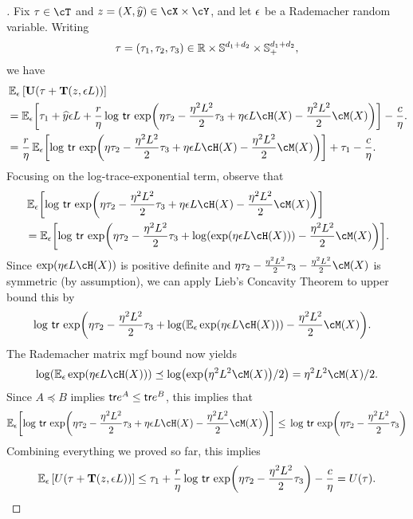 \begin{proof}[]
Fix $\tau\in\cT$ and $z=(X, \pred)\in\cX\times{}\cY$, and let $\epsilon$ be a Rademacher random variable. Writing
\[
\tau = (\tau_{1}, \tau_{2}, \tau_{3})\in{\mathbb R}\times \mathbb{S}^{d_1+d_2}\times \mathbb{S}^{d_1+d_2}_{+},
\]
we have
\begin{align*}
 &\En_{\eps}\left[\burk(\tau + \suff(z,\eps{}L))\right] \\
 &= \En_{\eps}\brk*{
   \tau_{1} + \pred\eps{}L + \frac{r}{\eta}\log\,\Tr\,\exp\prn*{\eta{}\tau_{2} - \frac{\eta^{2}L^{2}}{2}\tau_{3} + \eta\eps{}L\cH(X) - \frac{\eta^{2}L^{2}}{2}\cM(X)}
   } - \frac{c}{\eta}. \\
   &= \frac{r}{\eta}\En_{\eps}\brk*{
     \log\,\Tr\,\exp\prn*{\eta{}\tau_{2} - \frac{\eta^{2}L^{2}}{2}\tau_{3} + \eta\eps{}L\cH(X) - \frac{\eta^{2}L^{2}}{2}\cM(X)}
   } +      \tau_{1} - \frac{c}{\eta}.
\end{align*}
Focusing on the log-trace-exponential term, observe that
\begin{align*}
  &  \En_{\eps}\brk*{
  \log\,\Tr\,\exp\prn*{\eta{}\tau_{2} - \frac{\eta^{2}L^{2}}{2}\tau_{3} + \eta\eps{}L\cH(X) - \frac{\eta^{2}L^{2}}{2}\cM(X)}
} \\
&=  \En_{\eps}\brk*{
       \log\,\Tr\,\exp\prn*{\eta{}\tau_{2} - \frac{\eta^{2}L^{2}}{2}\tau_{3} + \log\prn*{\exp\prn*{\eta\eps{}L\cH(X)}} - \frac{\eta^{2}L^{2}}{2}\cM(X)}
       }.
\end{align*}
Since $\exp\prn*{\eta\eps{}L\cH(X)}$ is positive definite and $\eta{}\tau_{2} - \frac{\eta^{2}L^{2}}{2}\tau_{3} -\frac{\eta^{2}L^{2}}{2}\cM(X)$ is symmetric (by assumption), we can apply Lieb's Concavity Theorem to upper bound this by
\begin{align*}	   
  & \log\,\Tr\,\exp\prn*{\eta{}\tau_{2} - \frac{\eta^{2}L^2}{2}\tau_{3} + \log\prn*{\En_{\eps}\exp\prn*{\eta\eps{}L\cH(X)}} - \frac{\eta^{2}L^2}{2}\cM(X)}.
\end{align*}
The Rademacher matrix mgf bound \citep{tropp2012user} now yields
\[
\log\prn*{\En_{\eps}\exp\prn*{\eta\eps{}L\cH(X)}} \preceq \log\prn*{\exp\prn*{\eta^{2}L^{2}\cM(X)}/2} = \eta^{2}L^{2}\cM(X)/2.
\]
Since $A\preceq{}B$ implies $\mathsf{tr}{}e^{A}\leq{}\mathsf{tr}{}e^{B}$, this implies that
\[
\En_{\eps}\brk*{
  \log\,\Tr\,\exp\prn*{\eta{}\tau_{2} - \frac{\eta^{2}L^{2}}{2}\tau_{3} + \eta\eps{}L\cH(X) - \frac{\eta^{2}L^{2}}{2}\cM(X)}
}
\leq{}
  \log\,\Tr\,\exp\prn*{\eta{}\tau_{2} - \frac{\eta^{2}L^{2}}{2}\tau_{3}}
\]
Combining everything we proved so far, this implies
\[
  \En_{\eps}\left[U(\tau + \suff(z,\eps{}L))\right]
  \leq{} \tau_{1} + \frac{r}{\eta}  \log\,\Tr\,\exp\prn*{\eta{}\tau_{2} - \frac{\eta^{2}L^2}{2}\tau_{3}}  - \frac{c}{\eta} = U(\tau).
\]

\end{proof}

